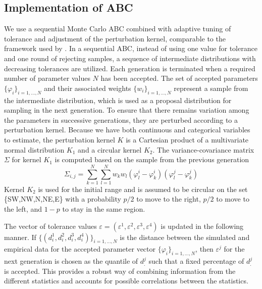 \subsection*{Implementation of ABC}
\noindent We use a sequential Monte Carlo ABC combined with adaptive tuning of tolerance and adjustment of the perturbation kernel, comparable to the framework used by \citet{Numminen2013}. 
In a sequential ABC, instead of using one value for tolerance and one round of rejecting samples, a sequence of intermediate distributions with decreasing tolerances are utilized. 
Each generation is terminated when a required number of parameter values $N$ has been accepted. 
The set of accepted parameters $\{\varphi_i \}_{i=1,\ldots,N}$ and their associated weights $\{w_i \}_{i=1, \ldots, N}$ represent a sample from the intermediate distribution, which is used as a proposal distribution for sampling in the next generation. 
To ensure that there remains variation among the parameters in successive generations, they are perturbed according to a perturbation kernel. 
Because we have both continuous and categorical variables to estimate, the perturbation kernel $K$ is a Cartesian product of a multivariate normal distribution $K_1$ and a circular kernel $K_2$.  
The variance-covariance matrix $\Sigma$ for kernel $K_1$ is computed based on the sample from the previous generation
\begin{equation}
	\Sigma_{i,j} = \sum_{k=1}^N \sum_{l=1}^N w_k w_l  (\varphi_l^i - \varphi_k^i)  (\varphi_l^j- \varphi_k^j) 
\label{eq:varcovar}
\end{equation}
Kernel $K_2$ is used for the initial range and is assumed to be circular on the set \{SW,NW,N,NE,E\} with a probability $p/2$ to move to the right, $p/2$ to move to the left, and $1-p$ to stay in the same region. 

The vector of tolerance values $\varepsilon=(\varepsilon^1,\varepsilon^2,\varepsilon^3,\varepsilon^4)$ is updated in the following manner. 
If $\{(d_i^1,d_i^2,d_i^3,d_i^4 )\}_{i=1,\ldots,N}$ is the distance between the simulated and empirical data for the accepted parameter vector $\{\varphi_i \}_{i=1,\ldots,N}$, then $\varepsilon^j$ for the next generation is chosen as the quantile of $d_.^j$ such that a fixed percentage of  $d_.^j$ is accepted. 
This provides a robust way of combining information from the different statistics and accounts for possible correlations between the statistics.
 
